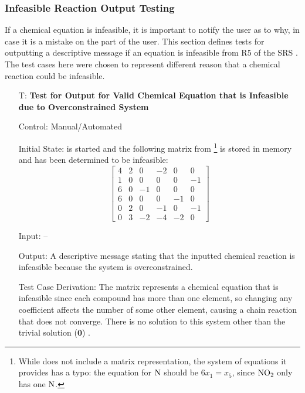 \documentclass[12pt, titlepage]{article}
\newcounter{testnum} %
\begin{document}
\subsubsection{Infeasible Reaction Output Testing}

If a chemical equation is infeasible, it is important to notify the user as to
why, in case it is a mistake on the part of the user. This section defines
tests for outputting a descriptive message if an equation is infeasible from
R5 of the SRS . 
The test cases here were chosen to represent different reason that a chemical
reaction could be infeasible.

\begin{enumerate}

  \item[T\refstepcounter{testnum}\thetestnum \label{test_over_valid_out}:]
    \textbf{Test for Output for Valid Chemical Equation that is Infeasible
      due to Overconstrained System}

    Control: Manual/Automated 

    Initial State: \progname{} is started and the following matrix from
    \cite{hamid_balancing_2019}\footnote{While \cite{hamid_balancing_2019}
      does not include a matrix representation, the
      system of equations it provides has a typo: the equation for $\ce{N}$
      should be $6x_1 = x_5$, since $\ce{NO2}$ only has one $\ce{N}$.} is
    stored in memory and has been determined to be infeasible:
    $$\begin{bmatrix}
        4 & 2 & 0  & -2 & 0  & 0  \\
        1 & 0 & 0  & 0  & 0  & -1 \\
        6 & 0 & -1 & 0  & 0  & 0  \\
        6 & 0 & 0  & 0  & -1 & 0  \\
        0 & 2 & 0  & -1 & 0  & -1 \\
        0 & 3 & -2 & -4 & -2 & 0
      \end{bmatrix}$$

    Input: --

    Output: A descriptive message stating that the inputted chemical reaction
    is infeasible because the system is overconstrained.

    Test Case Derivation: The matrix represents a chemical equation that is
    infeasible since
    each compound has more than one element, so changing any coefficient
    affects the number of some other element, causing a chain reaction that
    does not converge. There is no solution to this system other than the
    trivial solution ($\mathbf{0}$) \cite{hamid_balancing_2019}.


\end{enumerate}
\end{document}
